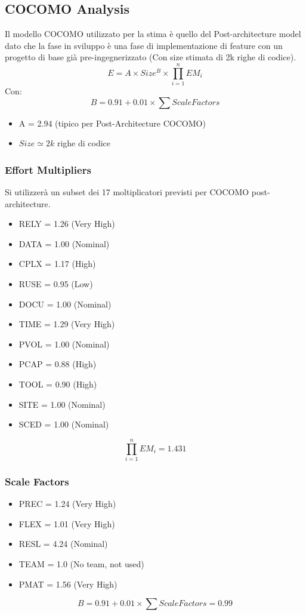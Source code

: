 \documentclass[11pt]{article}
\begin{document}
\subsection{COCOMO Analysis}
Il modello COCOMO utilizzato per la stima è quello del Post-architecture model dato che la fase in sviluppo è una fase di implementazione di feature con un progetto di base già pre-ingegnerizzato (Con size stimata di 2k righe di codice).
   \[ E = A \times Size^B \times \prod_{i=1}^{n} EM_i \]
   Con:
   \[ B = 0.91 + 0.01 \times \sum Scale Factors \]
   \begin{itemize}
   		\item A = 2.94 (tipico per Post-Architecture COCOMO)
		\item $Size \simeq 2k$ righe di codice
   \end{itemize}
\subsubsection{Effort Multipliers}
Si utilizzerà un subset dei 17 moltiplicatori previsti per COCOMO post-architecture.
\begin{itemize}
	\item RELY = 1.26 (Very High)
	\item DATA = 1.00 (Nominal)
	\item CPLX = 1.17 (High)
	\item RUSE = 0.95 (Low)
	\item DOCU = 1.00 (Nominal)
	\item TIME = 1.29 (Very High)
	\item PVOL = 1.00 (Nominal)
	\item PCAP = 0.88 (High)
	\item TOOL = 0.90 (High)
	\item SITE = 1.00 (Nominal)
	\item SCED = 1.00 (Nominal)
\end{itemize}
	\[
		\prod_{i=1}^{n} EM_i = 1.431
	\]
\subsubsection{Scale Factors}
\begin{itemize}
	\item PREC = 1.24 (Very High)
	\item FLEX = 1.01 (Very High)
	\item RESL = 4.24 (Nominal)
	\item TEAM = 1.0 (No team, not used)
	\item PMAT = 1.56 (Very High)
\end{itemize}
   \[ B = 0.91 + 0.01 \times \sum Scale Factors = 0.99 \]
\end{document}
